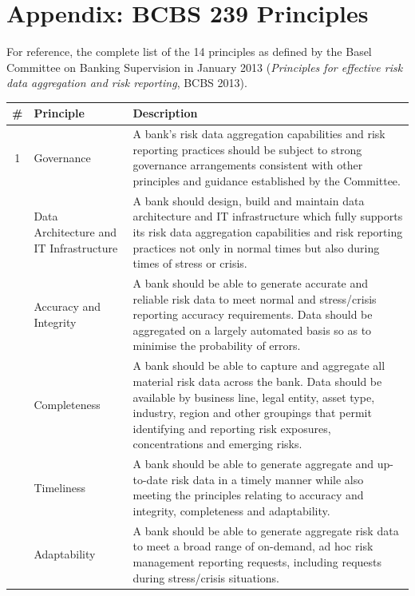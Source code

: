 \documentclass[11pt]{article}
\begin{document}
\section{Appendix: BCBS 239 Principles}

For reference, the complete list of the 14 principles as defined by the Basel
Committee on Banking Supervision in January 2013 (\textit{Principles for
effective risk data aggregation and risk reporting}, BCBS 2013).

\begin{longtable}{cp{3cm}p{10.5cm}}
    \toprule
    \textbf{\#} & \textbf{Principle} & \textbf{Description} \\
    \midrule
    \endhead
    1 & Governance & A bank's risk data aggregation capabilities and risk reporting practices should be subject to strong governance arrangements consistent with other principles and guidance established by the Committee. \\
    \addlinespace
    2 & Data Architecture and IT Infrastructure & A bank should design, build and maintain data architecture and IT infrastructure which fully supports its risk data aggregation capabilities and risk reporting practices not only in normal times but also during times of stress or crisis. \\
    \addlinespace
    3 & Accuracy and Integrity & A bank should be able to generate accurate and reliable risk data to meet normal and stress/crisis reporting accuracy requirements. Data should be aggregated on a largely automated basis so as to minimise the probability of errors. \\
    \addlinespace
    4 & Completeness & A bank should be able to capture and aggregate all material risk data across the bank. Data should be available by business line, legal entity, asset type, industry, region and other groupings that permit identifying and reporting risk exposures, concentrations and emerging risks. \\
    \addlinespace
    5 & Timeliness & A bank should be able to generate aggregate and up-to-date risk data in a timely manner while also meeting the principles relating to accuracy and integrity, completeness and adaptability. \\
    \addlinespace
    6 & Adaptability & A bank should be able to generate aggregate risk data to meet a broad range of on-demand, ad hoc risk management reporting requests, including requests during stress/crisis situations. \\

\end{longtable}
\end{document}
